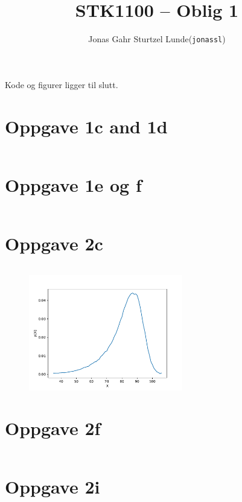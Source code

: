 \documentclass[10pt,a4paper]{article}
\begin{document}
\title{STK1100 -- Oblig 1}
\author{
    \begin{tabular}{r l}
        Jonas Gahr Sturtzel Lunde & (\texttt{jonassl})
    \end{tabular}}
\date{}    %

\maketitle


Kode og figurer ligger til slutt.




\section*{Oppgave 1c and 1d}
\inputminted[frame=single, fontsize=\footnotesize]{Python}{src/1cd.py}


\section*{Oppgave 1e og f}
\inputminted[frame=single, fontsize=\footnotesize]{Python}{src/1ef.py}


\section*{Oppgave 2c}
\inputminted[frame=single, fontsize=\footnotesize]{Python}{src/2c.py}
\begin{figure}[H]
\centering
\includegraphics[width=0.6\textwidth]{2c.pdf}
\end{figure}


\section*{Oppgave 2f}
\inputminted[frame=single, fontsize=\footnotesize]{Python}{src/2f.py}


\section*{Oppgave 2i}
\inputminted[frame=single, fontsize=\footnotesize]{Python}{src/2i.py}
\end{document}
